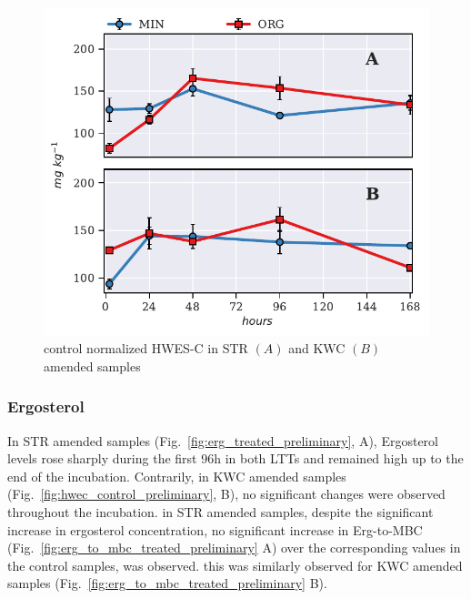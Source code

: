 \documentclass[12pt]{report}
\begin{document}
		
		\begin{figure}[H]
			\centering
			\includegraphics[scale=1]{thesis_figures/preliminary/control_normalized/HWES-C.pdf}
			\caption{control normalized HWES-C in STR $\left(A\right)$ and KWC $\left(B\right)$ amended   samples}
			\label{fig:nor_hwes-c_treated_preliminary}
		\end{figure}
		
	\subsubsection{Ergosterol}
		In STR amended samples (Fig.\ \ref{fig:erg_treated_preliminary}, A), Ergosterol levels rose sharply during the first 96h in both LTTs and remained high up to the end of the incubation. Contrarily, in KWC amended samples (Fig.\ \ref{fig:hwec_control_preliminary}, B), no significant changes were observed throughout the incubation. in STR amended samples, despite the significant increase in ergosterol concentration, no significant increase in Erg-to-MBC (Fig.\ \ref{fig:erg_to_mbc_treated_preliminary} A) over the corresponding values in the control samples, was observed. this was similarly observed for KWC amended samples (Fig.\ \ref{fig:erg_to_mbc_treated_preliminary} B). 
		
\end{document}
